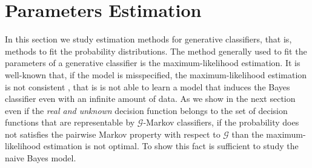 \documentclass[11pt,a4paper, twoside]{book}
\newcommand{\Pp}{\operatorname{P}}
\newcommand{\bx}{\mathbf{x}}
\begin{document}
\section{Parameters Estimation}
\label{sec:learning}

In this section we study estimation methods for generative classifiers, that is, methods to fit the probability distributions.
The method generally used to fit the parameters of a generative classifier is the maximum-likelihood estimation. It is well-known that, if the model is misspecified, the maximum-likelihood estimation is not consistent \citep{ptpr}, that is is not able to learn a model that induces the Bayes classifier even with an infinite amount of data. 
As we show in the next section even if the \textit{real and unknown} decision function belongs to the set of decision functions that are representable by $\mathcal{G}$-Markov classifiers, if the probability does not satisfies the pairwise Markov property with respect to $\mathcal{G}$  than 
the maximum-likelihood estimation is not optimal.
To show this fact is sufficient to study the naive Bayes model.



%
\end{document}
